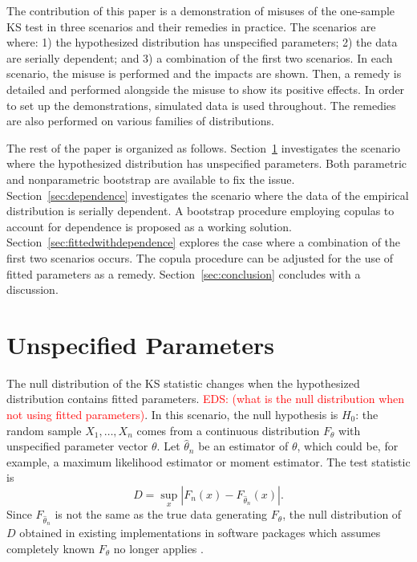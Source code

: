 \documentclass[12pt, letterpaper, titlepage]{article}
\newcommand{\eds}[1]{\textcolor{red}{EDS: (#1)}}
\begin{document}
The contribution of this paper is a demonstration of misuses of the one-sample
KS test in three scenarios and their remedies in practice. The scenarios are
where:
1) the hypothesized distribution has unspecified parameters;
2) the data are serially dependent; and
3) a combination of the first two scenarios.
In each scenario, the misuse is performed and the impacts are shown. Then, a
remedy is detailed and performed alongside the misuse to show its positive
effects. In order to set up the demonstrations, simulated data is used
throughout. The remedies are also performed on various families of
distributions.


The rest of the paper is organized as follows. Section~\ref{sec:fitted}
investigates the scenario where the hypothesized distribution has unspecified
parameters. Both parametric and nonparametric bootstrap are available to fix the
issue. Section~\ref{sec:dependence} investigates the scenario where the data of
the empirical distribution is serially dependent. A bootstrap procedure
employing copulas to account for dependence is proposed as a working solution.
Section~\ref{sec:fittedwithdependence}
explores the case where a combination of the first two scenarios occurs. The
copula procedure can be adjusted for the use of fitted parameters as a remedy.
Section~\ref{sec:conclusion} concludes with a discussion.

\section{Unspecified Parameters}
\label{sec:fitted}

The null distribution of the KS statistic changes when the hypothesized
distribution contains fitted parameters.
\eds{what is the null distribution when not using fitted parameters}.
In this scenario, the null hypothesis
is $H_0$: the random sample $X_1, \ldots, X_n$ comes from a continuous
distribution $F_{\theta}$ with unspecified parameter vector $\theta$.
Let $\hat\theta_n$ be an estimator of $\theta$, which could be, for example, a
maximum likelihood estimator or moment estimator. The test statistic is
\begin{equation}
  \label{eq:ks_fitted}
  D = \sup_x | F_n(x) - F_{\hat\theta_n}(x) |.
\end{equation}
Since $F_{\hat\theta_n}$ is not the same as the true data generating
$F_\theta$, the null distribution of $D$ obtained in existing implementations in
software packages which assumes completely known $F_\theta$ no longer applies
\citep{Steinskog}.
\end{document}
